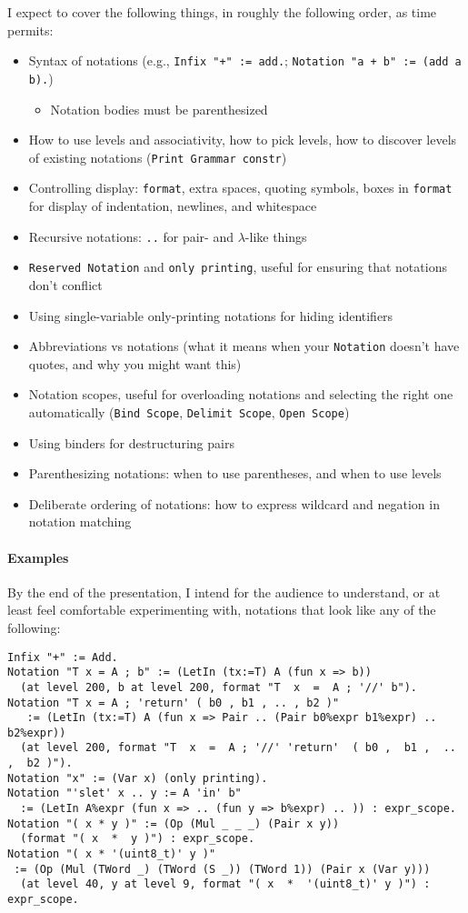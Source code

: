 \documentclass{article}
\begin{document}
I expect to cover the following things, in roughly the following order, as time permits:
\begin{itemize}
  \item Syntax of notations (e.g., \texttt{Infix "+" := add.}; \texttt{Notation "a + b" := (add a b).})
    \begin{itemize}
        \item Notation bodies must be parenthesized
    \end{itemize}
  \item How to use levels and associativity, how to pick levels, how to discover levels of existing notations (\texttt{Print Grammar constr})
  \item Controlling display: \texttt{format}, extra spaces, quoting symbols, boxes in \texttt{format} for display of indentation, newlines, and whitespace
  \item Recursive notations: \texttt{..} for pair- and $\lambda$-like things
  \item \texttt{Reserved Notation} and \texttt{only printing}, useful for ensuring that notations don't conflict
  \item Using single-variable only-printing notations for hiding identifiers
  \item Abbreviations vs notations (what it means when your \texttt{Notation} doesn't have quotes, and why you might want this)
  \item Notation scopes, useful for overloading notations and selecting the right one automatically (\texttt{Bind Scope}, \texttt{Delimit Scope}, \texttt{Open Scope})
  \item Using binders for destructuring pairs
  \item Parenthesizing notations: when to use parentheses, and when to use levels
  \item Deliberate ordering of notations: how to express wildcard and negation in notation matching
\end{itemize}

\paragraph{Examples}
By the end of the presentation, I intend for the audience to understand, or at least feel comfortable experimenting with, notations that look like any of the following:
\begin{verbatim}
Infix "+" := Add.
Notation "T x = A ; b" := (LetIn (tx:=T) A (fun x => b))
  (at level 200, b at level 200, format "T  x  =  A ; '//' b").
Notation "T x = A ; 'return' ( b0 , b1 , .. , b2 )"
   := (LetIn (tx:=T) A (fun x => Pair .. (Pair b0%expr b1%expr) .. b2%expr))
  (at level 200, format "T  x  =  A ; '//' 'return'  ( b0 ,  b1 ,  .. ,  b2 )").
Notation "x" := (Var x) (only printing).
Notation "'slet' x .. y := A 'in' b"
  := (LetIn A%expr (fun x => .. (fun y => b%expr) .. )) : expr_scope.
Notation "( x * y )" := (Op (Mul _ _ _) (Pair x y))
  (format "( x  *  y )") : expr_scope.
Notation "( x * '(uint8_t)' y )"
 := (Op (Mul (TWord _) (TWord (S _)) (TWord 1)) (Pair x (Var y)))
  (at level 40, y at level 9, format "( x  *  '(uint8_t)' y )") : expr_scope.
\end{verbatim}
\end{document}
